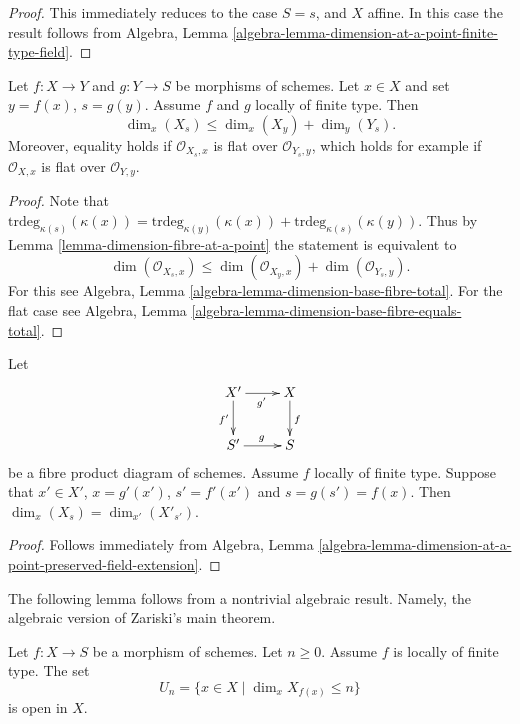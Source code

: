 \begin{proof}
This immediately reduces to the case $S = s$, and $X$ affine.
In this case the result follows from
Algebra, Lemma \ref{algebra-lemma-dimension-at-a-point-finite-type-field}.
\end{proof}

\begin{lemma}
\label{lemma-dimension-fibre-at-a-point-additive}
Let $f : X \to Y$ and $g : Y \to S$ be morphisms of schemes.
Let $x \in X$ and set $y = f(x)$, $s = g(y)$.
Assume $f$ and $g$ locally of finite type.
Then
$$
\dim_x(X_s) \leq \dim_x(X_y) + \dim_y(Y_s).
$$
Moreover, equality holds if $\mathcal{O}_{X_s, x}$ is flat
over $\mathcal{O}_{Y_s, y}$, which holds for example if $\mathcal{O}_{X, x}$
is flat over $\mathcal{O}_{Y, y}$.
\end{lemma}

\begin{proof}
Note that $\text{trdeg}_{\kappa(s)}(\kappa(x)) =
\text{trdeg}_{\kappa(y)}(\kappa(x)) + \text{trdeg}_{\kappa(s)}(\kappa(y))$.
Thus by Lemma \ref{lemma-dimension-fibre-at-a-point} the statement
is equivalent to
$$
\dim(\mathcal{O}_{X_s, x})
\leq
\dim(\mathcal{O}_{X_y, x}) + \dim(\mathcal{O}_{Y_s, y}).
$$
For this see Algebra, Lemma \ref{algebra-lemma-dimension-base-fibre-total}.
For the flat case see
Algebra, Lemma \ref{algebra-lemma-dimension-base-fibre-equals-total}.
\end{proof}

\begin{lemma}
\label{lemma-dimension-fibre-after-base-change}
Let
$$
\xymatrix{
X' \ar[r]_{g'} \ar[d]_{f'} & X \ar[d]^f \\
S' \ar[r]^g & S
}
$$
be a fibre product diagram of schemes. Assume $f$ locally of finite type.
Suppose that $x' \in X'$, $x = g'(x')$, $s' = f'(x')$ and
$s = g(s') = f(x)$. Then $\dim_x(X_s) = \dim_{x'}(X'_{s'})$.
\end{lemma}

\begin{proof}
Follows immediately from
Algebra,
Lemma \ref{algebra-lemma-dimension-at-a-point-preserved-field-extension}.
\end{proof}

\noindent
The following lemma follows from a nontrivial algebraic result.
Namely, the algebraic version of Zariski's main theorem.

\begin{lemma}
\label{lemma-openness-bounded-dimension-fibres}
Let $f : X \to S$ be a morphism of schemes.
Let $n \geq 0$. Assume $f$ is locally of finite type.
The set
$$
U_n = \{x \in X \mid \dim_x X_{f(x)} \leq n\}
$$
is open in $X$.
\end{lemma}

